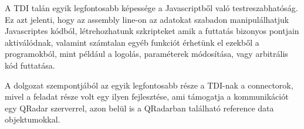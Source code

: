 A TDI talán egyik legfontosabb képessége a Javascriptből való testreszabhatóság. Ez azt jelenti, hogy az assembly line-on az adatokat szabadon manipulálhatjuk Javascriptes kódból, létrehozhatunk szkripteket amik a futtatás bizonyos pontjain aktiválódnak, valamint számtalan egyéb funkciót érhetünk el ezekből a programokból, mint például a logolás, paraméterek módosítása, vagy arbitrális kód futtatása.

A dolgozat szempontjából az egyik legfontosabb része a TDI-nak a connectorok, mivel a feladat része volt egy ilyen fejlesztése, ami támogatja a kommunikációt egy QRadar szerverrel, azon belül is a QRadarban található reference data objektumokkal.
